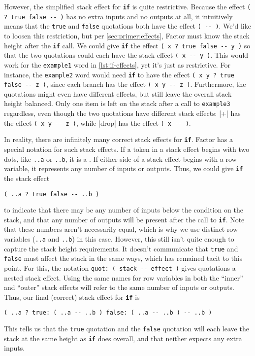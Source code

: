 
However, the simplified stack effect for \texttt{\textbf{if}} is quite
restrictive.  Because the effect
%
\Verb|( ? true false -- )|
%
has no extra inputs and no outputs at all, it intuitively means that the
\Verb|true| and \Verb|false| quotations both have the effect
%
\Verb|( -- )|.
%
We'd like to loosen this restriction, but per \cref{sec:primer:effects}, Factor
must know the stack height after the \texttt{\textbf{if}} call.  We could give
\texttt{\textbf{if}} the effect
%
\Verb|( x ? true false -- y )|
%
so that the two quotations could each have the stack effect
%
\Verb|( x -- y )|.
%
This would work for the \Verb|example1| word in \vref{lst:if-effects}, yet it's
just as restrictive.  For instance, the \Verb|example2| word would need
\texttt{\textbf{if}} to have the effect
%
\Verb|( x y ? true false -- z )|,
%
since each branch has the effect
%
\Verb|( x y -- z )|.
%
Furthermore, the quotations might even have different effects, but still leave
the overall stack height balanced.  Only one item is left on the stack after a
call to \Verb|example3| regardless, even though the two quotations have
different stack effects: \factor|+| has the effect
%
\Verb|( x y -- z )|,
%
while \factor|drop| has the effect
%
\Verb|( x -- )|.

In reality, there are infinitely many correct stack effects for
\texttt{\textbf{if}}.  Factor has a special notation for such
 stack effects.  If a token in a stack effect begins with
two dots, like \Verb|..a| or \Verb|..b|, it is a .  If
either side of a stack effect begins with a row variable, it represents any
number of inputs or outputs.  Thus, we could give \texttt{\textbf{if}} the
stack effect
%
\begin{center} \Verb|( ..a ? true false -- ..b )| \end{center}
%
\noindent to indicate that there may be any number of inputs below the
condition on the stack, and that any number of outputs will be present after
the call to \texttt{\textbf{if}}.  Note that these numbers aren't necessarily
equal, which is why we use distinct row variables (\Verb|..a| and \Verb|..b|)
in this case.  However, this still isn't quite enough to capture the stack
height requirements.  It doesn't communicate that \Verb|true| and \Verb|false|
must affect the stack in the same ways, which has remained tacit to this point.
For this, the notation
%
\Verb|quot: ( stack -- effect )|
%
gives quotations a nested stack effect.  Using the same names for row variables
in both the ``inner'' and ``outer'' stack effects will refer to the same number
of inputs or outputs.  Thus, our final (correct) stack effect for
\texttt{\textbf{if}} is 
%
\begin{center}
%
  \Verb|( ..a ? true: ( ..a -- ..b ) false: ( ..a -- ..b ) -- ..b )|
%
\end{center}
%
\noindent This tells us that the \Verb|true| quotation and the \Verb|false|
quotation will each leave the stack at the same height as \texttt{\textbf{if}}
does overall, and that neither expects any extra inputs.

